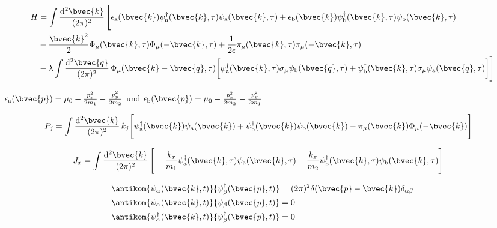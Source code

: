 %
\begin{align}
	H &= 
	 	\int \frac{\mathrm{d}^{2}\bvec{k}}{(2\pi)^{2}}\,
	 	\Bigg[
	 		\epsilon_{\mathrm{a}}(\bvec{k})
	 		\psi_{\mathrm{a}}^{\dag}(\bvec{k},\tau)
	 		\psi_{\mathrm{a}}(\bvec{k},\tau)
	 		+
	 		\epsilon_{\mathrm{b}}(\bvec{k})
	 		\psi_{\mathrm{b}}^{\dag}(\bvec{k},\tau)
	 		\psi_{\mathrm{b}}(\bvec{k},\tau)
		\\ &
		-
		\frac{\bvec{k}^{2}}{2} \Phi_{\mu}(\bvec{k},\tau) \Phi_{\mu}(-\bvec{k},\tau)
		+
		\frac{1}{2\epsilon} \pi_{\mu}(\bvec{k},\tau) \pi_{\mu}(-\bvec{k},\tau)
		\\ &
		-
		\lambda \int \frac{\mathrm{d}^{2}\bvec{q}}{(2\pi)^{2}}\, \Phi_{\mu}(\bvec{k}-\bvec{q},\tau)
		\bigg[
			\psi_{\mathrm{a}}^{\dag}(\bvec{k},\tau) \sigma_{\mu} \psi_{\mathrm{b}}(\bvec{q},\tau)
			+
			\psi_{\mathrm{b}}^{\dag}(\bvec{k},\tau) \sigma_{\mu} \psi_{\mathrm{a}}(\bvec{q},\tau)
		\bigg]
		\Bigg]
\end{align}
%


$\epsilon_{\mathrm{a}}(\bvec{p}) = \mu_{0} - \frac{p_{x}^{2}}{2m_{1}} - \frac{p_{y}^{2}}{2m_{2}}$ und $\epsilon_{\mathrm{b}}(\bvec{p}) = \mu_{0} - \frac{p_{x}^{2}}{2m_{2}} - \frac{p_{y}^{2}}{2m_{1}}$



%
\begin{align}
	P_{j} &= \int \frac{\mathrm{d}^{2}\bvec{k}}{(2\pi)^{2}}\, k_{j}\Bigg[
	 	\psi_{\mathrm{a}}^{\dag}(\bvec{k})
	 	\psi_{\mathrm{a}}(\bvec{k})
	 	+
	 	\psi_{\mathrm{b}}^{\dag}(\bvec{k})
	 	\psi_{\mathrm{b}}(\bvec{k})
	 	-
	 	\pi_{\mu}(\bvec{k})
	 	\Phi_{\mu}(-\bvec{k})
	\Bigg]
\end{align}
%


%
\begin{align}
	J_{x} &= \int \frac{\mathrm{d}^{2}\bvec{k}}{(2\pi)^{2}}\, \Bigg[
		-
		\frac{k_{x}}{m_{1}}
		\psi_{\mathrm{a}}^{\dag}(\bvec{k},\tau)
		\psi_{\mathrm{a}}(\bvec{k},\tau)
		-
		\frac{k_{x}}{m_{2}}
		\psi_{\mathrm{b}}^{\dag}(\bvec{k},\tau)
		\psi_{\mathrm{b}}(\bvec{k},\tau)
	\Bigg]
\end{align}
%

%
\begin{align}
	&\antikom{\psi_{\mathrm{\alpha}}(\bvec{k},t)}{\psi_{\mathrm{\beta}}^{\dag}(\bvec{p},t)} = (2\pi)^{2}\delta(\bvec{p}-\bvec{k})\delta_{\mathrm{\alpha}\mathrm{\beta}}
	\\
	&\antikom{\psi_{\mathrm{\alpha}}(\bvec{k},t)}{\psi_{\mathrm{\beta}}(\bvec{p},t)} = 0
	\\
	&\antikom{\psi_{\mathrm{\alpha}}^{\dag}(\bvec{k},t)}{\psi_{\mathrm{\beta}}^{\dag}(\bvec{p},t)} = 0
\end{align}
%



